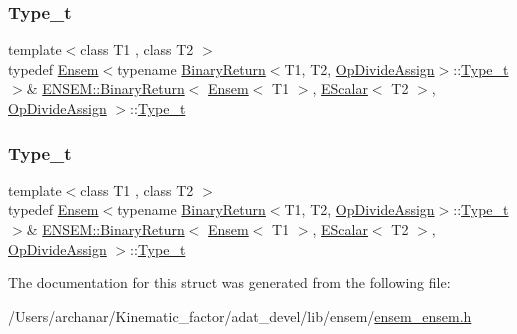\subsubsection{\texorpdfstring{Type\_t}{Type\_t}\hspace{0.1cm}{\footnotesize\ttfamily [1/2]}}
{\footnotesize\ttfamily template$<$class T1 , class T2 $>$ \\
typedef \mbox{\hyperlink{classENSEM_1_1Ensem}{Ensem}}$<$typename \mbox{\hyperlink{structENSEM_1_1BinaryReturn}{Binary\+Return}}$<$T1, T2, \mbox{\hyperlink{structENSEM_1_1OpDivideAssign}{Op\+Divide\+Assign}}$>$\+::\mbox{\hyperlink{structENSEM_1_1BinaryReturn_3_01Ensem_3_01T1_01_4_00_01EScalar_3_01T2_01_4_00_01OpDivideAssign_01_4_aaecbcd931e5cb68f68b31ea753ac6d33}{Type\+\_\+t}}$>$\& \mbox{\hyperlink{structENSEM_1_1BinaryReturn}{E\+N\+S\+E\+M\+::\+Binary\+Return}}$<$ \mbox{\hyperlink{classENSEM_1_1Ensem}{Ensem}}$<$ T1 $>$, \mbox{\hyperlink{classENSEM_1_1EScalar}{E\+Scalar}}$<$ T2 $>$, \mbox{\hyperlink{structENSEM_1_1OpDivideAssign}{Op\+Divide\+Assign}} $>$\+::\mbox{\hyperlink{structENSEM_1_1BinaryReturn_3_01Ensem_3_01T1_01_4_00_01EScalar_3_01T2_01_4_00_01OpDivideAssign_01_4_aaecbcd931e5cb68f68b31ea753ac6d33}{Type\+\_\+t}}}

\mbox{\label{structENSEM_1_1BinaryReturn_3_01Ensem_3_01T1_01_4_00_01EScalar_3_01T2_01_4_00_01OpDivideAssign_01_4_aaecbcd931e5cb68f68b31ea753ac6d33}} 
\subsubsection{\texorpdfstring{Type\_t}{Type\_t}\hspace{0.1cm}{\footnotesize\ttfamily [2/2]}}
{\footnotesize\ttfamily template$<$class T1 , class T2 $>$ \\
typedef \mbox{\hyperlink{classENSEM_1_1Ensem}{Ensem}}$<$typename \mbox{\hyperlink{structENSEM_1_1BinaryReturn}{Binary\+Return}}$<$T1, T2, \mbox{\hyperlink{structENSEM_1_1OpDivideAssign}{Op\+Divide\+Assign}}$>$\+::\mbox{\hyperlink{structENSEM_1_1BinaryReturn_3_01Ensem_3_01T1_01_4_00_01EScalar_3_01T2_01_4_00_01OpDivideAssign_01_4_aaecbcd931e5cb68f68b31ea753ac6d33}{Type\+\_\+t}}$>$\& \mbox{\hyperlink{structENSEM_1_1BinaryReturn}{E\+N\+S\+E\+M\+::\+Binary\+Return}}$<$ \mbox{\hyperlink{classENSEM_1_1Ensem}{Ensem}}$<$ T1 $>$, \mbox{\hyperlink{classENSEM_1_1EScalar}{E\+Scalar}}$<$ T2 $>$, \mbox{\hyperlink{structENSEM_1_1OpDivideAssign}{Op\+Divide\+Assign}} $>$\+::\mbox{\hyperlink{structENSEM_1_1BinaryReturn_3_01Ensem_3_01T1_01_4_00_01EScalar_3_01T2_01_4_00_01OpDivideAssign_01_4_aaecbcd931e5cb68f68b31ea753ac6d33}{Type\+\_\+t}}}



The documentation for this struct was generated from the following file\+:\begin{DoxyCompactItemize}
\item 
/\+Users/archanar/\+Kinematic\+\_\+factor/adat\+\_\+devel/lib/ensem/\mbox{\hyperlink{lib_2ensem_2ensem__ensem_8h}{ensem\+\_\+ensem.\+h}}\end{DoxyCompactItemize}
